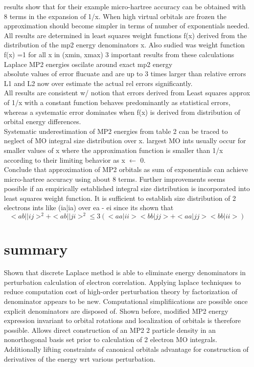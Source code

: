 \documentclass[10pt, draft]{article}
\begin{document}
results show that for their example micro-hartree accuracy can be obtained with 8 terms in the expansion of 1/x.  When high virtual orbitals are frozen the approximation should become simpler in terms of number of exponentials needed.  All results are determined in least squares weight functions f(x) derived from the distribution of the mp2 energy denominators x. Also sudied was weight function f(x) =1 for all x in (xmin, xmax)  3 important results from these calculations\\
Laplace MP2 energies oscilate around exact mp2 energy\\
absolute values of error flucuate and are up to 3 times larger than relative errors\\
L1 and L2 now over estimate the actual rel errors significantly.\\
All results are consistent w/ notion that errors derived from Least squares approx of 1/x with a constant function behaves predominantly as statistical errors, whereas a systematic error dominates when f(x) is derived from distribution of orbital energy differences.  \\
Systematic underestimation of MP2 energies from table 2 can be traced to neglect of MO integral size distribution over x.  largest MO ints usually occur for smaller values of x where the approximation function is smaller than 1/x according to their limiting behavior as x $\leftarrow$ 0.  \\
Conclude that approximation of MP2 orbitals as sum of exponentials can achieve micro-hartree accuracy using about 8 terms.  Further improvements seems possible if an empirically established integral size distribution is incorporated into least squares weight function.  It is sufficient to establish size distribution of 2 electrons ints like (ia|ia) over ea - ei since its shown that 
\[ <ab||ij>^2 + <ab||ji>^2 \leq 3( <aa|ii> < bb|jj> + <aa|jj> <bb|ii>)\]

\section{summary}
Shown that discrete Laplace method is able to eliminate energy denominators in perturbation calculation of electron correlation.  Applying laplace techniques to reduce computation cost of high-order perturbation theory by factorization of denominator appears to be new.  Computational simplifiications are possible once explicit denominators are disposed of.  Shown before, modified MP2 energy expression invariant to orbital rotations and localization of orbitals is therefore possible.  Allows direct construction of an MP2 2 particle density in an nonorthogonal basis set prior to calculation of 2 electron MO integrals.  Additionally lifting constraints of canonical orbitals advantage for construction of derivatives of the energy wrt various perturbation. 
\end{document}
